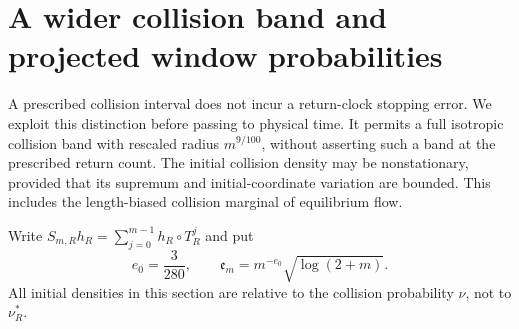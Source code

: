 \section{A wider collision band and projected window probabilities}
\label{sec:stationary-collision-band}
A prescribed collision interval does not incur a return-clock stopping
error. We exploit this distinction before passing to physical time.
It permits a full isotropic collision band with rescaled radius
$m^{9/100}$, without asserting such a band at the prescribed return
count. The initial collision density may be nonstationary, provided
that its supremum and initial-coordinate variation are bounded.
This includes the length-biased collision marginal of equilibrium flow.

Write $S_{m,R}h_R=\sum_{j=0}^{m-1}h_R\circ T_R^j$ and put
\[
 e_0=\frac3{280},\qquad
 \mathfrak e_m=m^{-e_0}\sqrt{\log(2+m)}.
\]
All initial densities in this section are relative to the collision
probability $\nu$, not to $\nu_R^*$.

